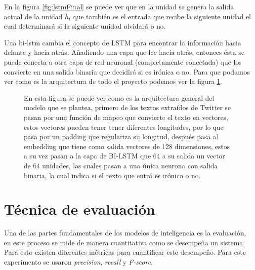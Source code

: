 \par En la figura \ref{fig:lstmFinal} se puede ver que en la unidad se genera la salida actual de la unidad $h_t$ que también es el entrada que recibe la siguiente unidad el cual determinará si la siguiente unidad olvidará o no.

\par Una \gls{bi-lstm} cambia el concepto de LSTM para encontrar la información hacia delante y hacia atrás. Añadiendo una capa que lee hacia atrás, entonces ésta se puede conecta a otra capa de red neuronal (completamente conectada) que los convierte en una salida binaria que decidirá si es irónica o no. Para que podamos ver como es la arquitectura de todo el proyecto podemos ver la figura \ref{fig:arquitectura}.

\begin{landscape}

	\begin{figure}
		\centering
		
		\caption{En esta figura se puede ver como es la arquitectura general del modelo que se plantea, primero de los textos extraídos de Twitter se pasan por una función de mapeo que convierte el texto en vectores, estos vectores pueden tener tener diferentes longitudes, por lo que pasa por un \gls{padding} que regulariza su longitud, después pasa al embedding que tiene como salida vectores de 128 dimensiones, estos a su vez pasan a la capa de BI-LSTM que 64 a su salida un vector de 64 unidades, las cuales pasan a una única neurona con salida binaria, la cual indica si el texto que entró es irónico o no.}
		\label{fig:arquitectura}
	\end{figure}
\end{landscape}

\section{Técnica de evaluación}

\par Una de las partes fundamentales de los modelos de inteligencia es la evaluación, en este proceso se mide de manera cuantitativa como se desempeña un sistema. Para esto existen diferentes métricas para cuantificar este desempeño. Para este experimento se usaron \textit{precision}, \textit{recall} y \textit{F-score}.

